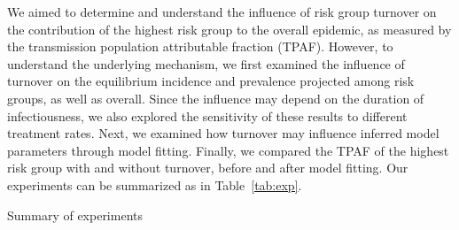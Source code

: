 We aimed to determine and understand the influence of risk group turnover on
the contribution of the highest risk group to the overall epidemic,
as measured by the transmission population attributable fraction (TPAF).
However, to understand the underlying mechanism,
we first examined the influence of turnover on
the equilibrium incidence and prevalence projected among risk groups, as well as overall.
Since the influence may depend on the duration of infectiousness,
we also explored the sensitivity of these results to different treatment rates.
Next, we examined how turnover may influence
inferred model parameters through model fitting.
Finally, we compared the TPAF of the highest risk group with and without turnover,
before and after model fitting.
Our experiments can be summarized as in Table~\ref{tab:exp}.
\begin{table}
  \centering
  \caption{Summary of experiments}
  \label{tab:exp}
  
\end{table}

